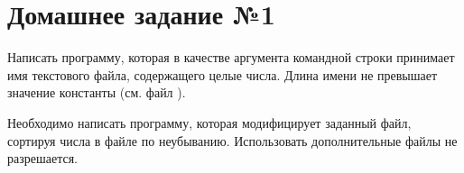 \section*{Домашнее задание №1}

Написать программу, которая в качестве аргумента командной строки
принимает имя текстового файла, содержащего целые числа. Длина имени
не превышает значение константы  (см. файл ).

Необходимо написать программу, которая модифицирует заданный файл,
сортируя числа в файле по неубыванию. Использовать дополнительные
файлы не разрешается.
